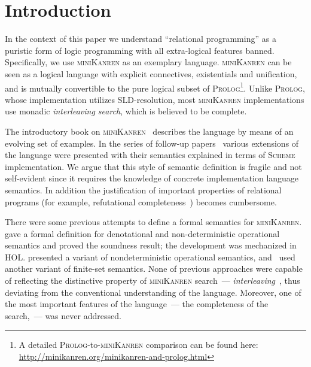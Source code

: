 \section{Introduction}

In the context of this paper we understand ``relational programming'' as a puristic form of logic programming with all extra-logical
features banned. Specifically, we use \textsc{miniKanren} as an exemplary language. \textsc{miniKanren} can be seen as
a logical language with explicit connectives, existentials and unification, and is mutually convertible to the pure logical subset of
\textsc{Prolog}\footnote{A detailed \textsc{Prolog}-to-\textsc{miniKanren} comparison can be found here: \url{http://minikanren.org/minikanren-and-prolog.html}}.
Unlike \textsc{Prolog}, whose implementation utilizes SLD-resolution, most \textsc{miniKanren} implementations use monadic \emph{interleaving
search}, which is believed to be complete.

The introductory book on \textsc{miniKanren}~\cite{TRS} describes the language by means of an evolving set of examples. In the
series of follow-up papers~\cite{MicroKanren,CKanren,CKanren1,AlphaKanren,2016,Guided} various extensions of the language were presented with
their semantics explained in terms of \textsc{Scheme} implementation. We argue that this style of semantic definition is
fragile and not self-evident since it requires the knowledge of concrete implementation language semantics. In addition the justification of
important properties of relational programs (for example, refutational completeness~\cite{WillThesis}) becomes cumbersome.

There were some previous attempts to define a formal semantics for \textsc{miniKanren}. \citet{MechanisingMiniKanren} gave a formal definition
for denotational and non-deterministic operational semantics and proved the soundness result; the development was mechanized in HOL. 
\citet{RelConversion} presented a variant of nondeterministic operational semantics, and~\citet{DivTest} used another variant of finite-set semantics.
None of previous approaches were capable of reflecting the distinctive property of \textsc{miniKanren} search~--- \emph{interleaving}~\cite{Search},
thus deviating from the conventional understanding of the language. Moreover, one of the most important features of the
language~--- the completeness of the search,~--- was never addressed.

